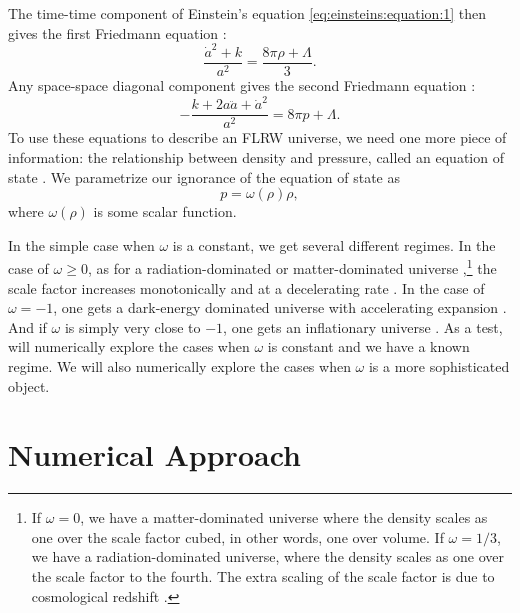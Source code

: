 \documentclass[]{article}
\begin{document}
The time-time component of Einstein's equation
\eqref{eq:einsteins:equation:1} then gives the first Friedmann equation \cite{Carroll,MisnerThorneWheeler,Kempf}:
\begin{equation}
  \label{eq:Friedmann:1}
  \frac{\dot{a}^2 + k}{a^2} = \frac{8\pi \rho + \Lambda}{3}.
\end{equation} 
Any space-space diagonal component gives the second Friedmann equation
\cite{Carroll,MisnerThorneWheeler,Kempf}:
\begin{equation}
  \label{eq:Friedmann:2}
  - \frac{k + 2a\ddot{a} + \dot{a}^2}{a^2} = 8\pi p + \Lambda.
\end{equation}
To use these equations to describe an FLRW universe, we need one more
piece of information: the relationship between density and pressure,
called an equation of state
\cite{Carroll,MisnerThorneWheeler,Kempf}. We parametrize our ignorance
of the equation of state as 
\begin{equation}
  \label{eq:def:eos}
  p = \omega(\rho) \rho,
\end{equation}
where $\omega(\rho)$ is some scalar function. 

In the simple case when $\omega$ is a constant, we get several
different regimes. In the case of $\omega \geq 0$, as for a
radiation-dominated or matter-dominated universe
\cite{MisnerThorneWheeler,Carroll,Kempf},\footnote{If $\omega=0$, we
  have a matter-dominated universe where the density scales as one
  over the scale factor cubed, in other words, one over volume. If
  $\omega=1/3$, we have a radiation-dominated universe, where the
  density scales as one over the scale factor to the fourth. The extra
  scaling of the scale factor is due to cosmological redshift
  \cite{Carroll,Kempf}.} the scale factor increases monotonically and
at a decelerating rate \cite{MisnerThorneWheeler,Carroll,Kempf}. In
the case of $\omega = -1$, one gets a dark-energy dominated universe
with accelerating expansion
\cite{MisnerThorneWheeler,Carroll,Kempf}. And if $\omega$ is simply
very close to $-1$, one gets an inflationary universe
\cite{MisnerThorneWheeler,Carroll,Kempf}. As a test, will numerically
explore the cases when $\omega$ is constant and we have a known
regime. We will also numerically explore the cases when $\omega$ is a
more sophisticated object.

\section{Numerical Approach}
\label{sec:numerical:approach}
\end{document}
